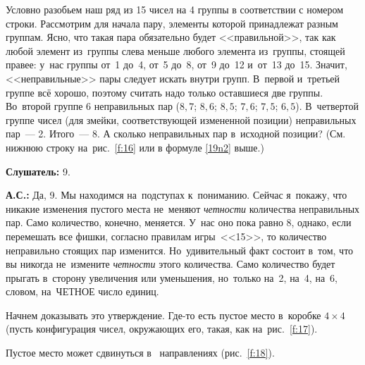 \smallskip

Условно разобьем наш ряд из 15 чисел на 4 группы в соответствии с номером строки.
Рассмотрим для начала пару, элементы которой принадлежат разным группам.
Ясно, что такая пара обязательно будет <<правильной>>, так как любой элемент из~группы слева меньше
любого элемента из~группы, стоящей правее: у~нас группы от~1 до~4, от~5 до~8, от~9 до~12 и~от~13 до~15.
Значит, <<неправильные>> пары следует искать внутри групп.
В~первой и~третьей группе всё хорошо, поэтому считать надо только оставшиеся две группы.
Во~второй группе 6 неправильных пар ($8,7$; $8,6$; $8,5$; $7,6$; $7,5$; $6,5$).
В~четвертой группе чисел (для змейки, соответствующей измененной позиции) неправильных пар~--- 2.
Итого~--- 8. А сколько неправильных пар в~исходной позиции?
(См. нижнюю строку на~рис.~\ref{f:16} или в формуле \eqref{19n2} выше.)
%


\textbf{Слушатель:} 9.


\textbf{А.С.:} Да, 9. Мы находимся на~подступах к~пониманию. Сейчас я~покажу, что никакие изменения
пустого места не~меняют \textit{четности} количества неправильных пар. Само количество, конечно, меняется.
У~нас оно пока равно 8, однако, если перемешать все фишки, согласно правилам игры~<<15>>, то количество
неправильно стоящих пар изменится. Но~удивительный факт состоит в~том, что вы никогда не~измените
\textit{четности} этого количества. Само количество будет прыгать в~сторону увеличения или уменьшения, но~только на~2,
на~4, на~6, словом, на~ЧЕТНОЕ число единиц.


Начнем доказывать это утверждение. Где-то есть пустое место в~коробке $4\times4$ (пусть конфигурация
чисел, окружающих его, такая, как на~рис.~\ref{f:17}).



Пустое место может сдвинуться в~ направлениях (рис.~\ref{f:18}).

